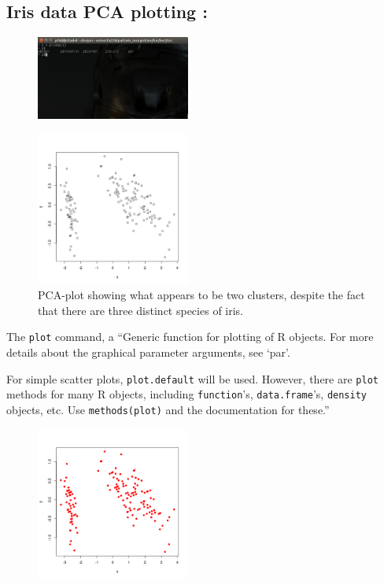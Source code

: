 \begin{multicols*}{2}
\section{Iris data PCA plotting :}

\begin{figure}[H]
  \centering
    \includegraphics[width=0.45\textwidth]{images/prcomp_tab.png}
\end{figure}

\begin{figure}[H]
  \centering
    \includegraphics[width=0.45\textwidth]{images/pca_plot.png}
  \caption{PCA-plot showing what appears to be two clusters, despite the fact that there are three distinct species of iris.}
\end{figure}

The \texttt{plot} command, a ``Generic function for plotting of R objects.  For more details about the graphical parameter arguments, see `par'.

For simple scatter plots, \texttt{plot.default} will be used.  However, there are \texttt{plot} methods for many R objects, including \texttt{function}'s, \texttt{data.frame}'s, \texttt{density} objects, etc.  Use \texttt{methods(plot)} and the documentation for these.''

\begin{figure}[H]
  \centering
    \includegraphics[width=0.45\textwidth]{images/pca_plot_red.png}
\end{figure}


\end{multicols*}
